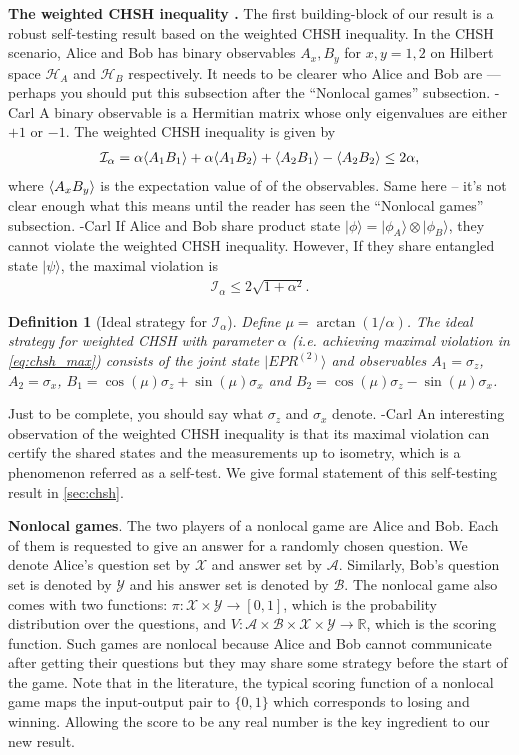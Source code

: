 \documentclass[11pt,letterpaper]{article}
\newcommand{\ket}[1]{|#1\rangle}
\newcommand{\x}{\otimes}
\DeclarePairedDelimiter{\ip}{\langle}{\rangle}
\newcommand{\R}{\mathbb{R}}
\newcommand{\calH}{\mathcal{H}}
\newcommand{\calX}{\mathcal{X}}
\newcommand{\calY}{\mathcal{Y}}
\newcommand{\calA}{\mathcal{A}}
\newcommand{\calB}{\mathcal{B}}
\newcommand{\1}{\mathbb{1}}
\newcommand{\EPR}[1]{EPR^{(#1)}}
\newcommand{\paulix}{\sigma_x}
\newcommand{\pauliz}{\sigma_z}
\newcommand{\I}{\mathcal{I}}
\def\carl#1{{\color{blue} #1 -Carl}}
\newtheorem{definition}[theorem]{Definition}
\theoremstyle{definition}
\begin{document}
\textbf{The weighted CHSH inequality \cite{acin2012}.}
The first building-block of our result is a robust self-testing result based on the weighted CHSH inequality.
In the CHSH scenario, Alice and Bob has binary observables $A_x,B_y$ for $x,y = 1,2$ 
on Hilbert space $\calH_A$ and $\calH_B$ respectively.  \carl{It needs to be clearer who Alice and Bob
are --- perhaps you should put this subsection after the ``Nonlocal games'' subsection.}
A binary observable is a Hermitian matrix whose only eigenvalues are either $+1$ or $-1$.
The weighted CHSH inequality is given by 
\begin{align}
	\label{eq:chsh_op}
	\I_\alpha = \alpha\ip{A_1B_1}+\alpha\ip{A_1B_2} + \ip{A_2B_1} - \ip{A_2B_2}\leq 2\alpha,
\end{align}
where $\ip{A_xB_y}$ is the expectation value of of the observables.  \carl{Same here -- it's not clear enough
what this means until the reader has seen the ``Nonlocal games'' subsection.}
If Alice and Bob share product state $\ket{\phi} = \ket{\phi_A} \x \ket{\phi_B}$, they cannot violate
the weighted CHSH inequality.
However, If they share entangled state $\ket{\psi}$, the maximal violation is 
\begin{align}
\label{eq:chsh_max}
 \I_\alpha \leq 2\sqrt{1+\alpha^2}.
\end{align}
\begin{definition}[Ideal strategy for $\I_\alpha$]
	\label{def:ideal}
	Define $\mu = \arctan(1/\alpha)$.
	The ideal strategy for weighted CHSH with parameter $\alpha$ (i.e. achieving maximal violation in \cref{eq:chsh_max})
	consists of the joint state $\ket{\EPR{2}}$ and observables $A_1 = \pauliz$, $A_2 = \paulix$,
	$B_1 = \cos(\mu) \pauliz+ \sin(\mu) \paulix$ and $B_2 = \cos(\mu) \pauliz - \sin(\mu) \paulix$.
\end{definition}
\carl{Just to be complete, you should say what $\pauliz$ and $\paulix$ denote.}
An interesting observation of the weighted CHSH inequality is that its maximal violation can certify the shared states and the 
measurements up to isometry, 
which is a phenomenon referred as a self-test. We give formal statement of this self-testing result in \cref{sec:chsh}.

\textbf{Nonlocal games}. The two players of a nonlocal game are Alice and Bob. Each of them is requested
to give an answer for a randomly chosen question. We denote Alice's question set by $\calX$ and answer set by $\calA$. Similarly,
Bob's question set is denoted by $\calY$ and his answer set is denoted by $\calB$. The nonlocal game also
comes with two functions: $\pi: \calX \times \calY \rightarrow [0,1]$, which is the probability distribution over the questions,
and $V: \calA \times \calB \times \calX \times \calY \rightarrow \R$, which is the scoring function. Such games are nonlocal
because Alice and Bob cannot communicate after getting their questions but they may share some strategy before 
the start of the game. Note that in the literature, the typical scoring function of a nonlocal game maps the input-output
pair to $\{0,1\}$ which corresponds to losing and winning. Allowing the score to be any real number is the key ingredient 
to our new result. 
\end{document}
